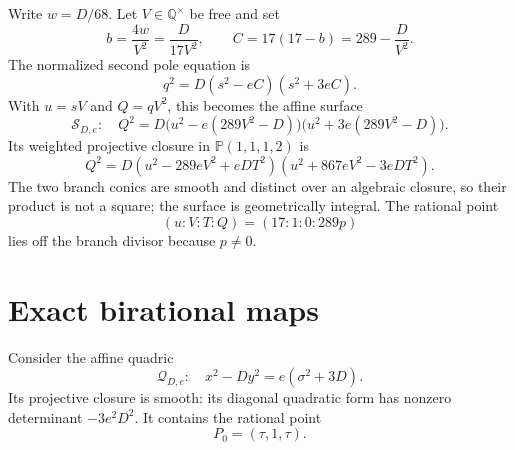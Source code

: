 \documentclass[11pt,a4paper]{article}
\theoremstyle{remark}\newtheorem{remark}[theorem]{Remark}
\newcommand{\Q}{\mathbb Q}\newcommand{\PP}{\mathbb P}
\begin{document}
Write $w=D/68$. Let $V\in\Q^\times$ be free and set
\begin{equation}\label{eq:input}
                 b=\frac{4w}{V^2}=\frac D{17V^2},
                 \qquad C=17(17-b)=289-\frac D{V^2}.
\end{equation}
The normalized second pole equation is
\begin{equation}\label{eq:normalized}
                         q^2=D(s^2-eC)(s^2+3eC).
\end{equation}
With $u=sV$ and $Q=qV^2$, this becomes the affine surface
\begin{equation}\label{eq:surface}
 \mathcal S_{D,e}:\quad
 Q^2=D\bigl(u^2-e(289V^2-D)\bigr)
          \bigl(u^2+3e(289V^2-D)\bigr).
\end{equation}
Its weighted projective closure in $\PP(1,1,1,2)$ is
\begin{equation}\label{eq:projective}
 Q^2=D(u^2-289eV^2+eDT^2)(u^2+867eV^2-3eDT^2).
\end{equation}
The two branch conics are smooth and distinct over an algebraic closure,
so their product is not a square; the surface is geometrically integral.
The rational point
\[
                     (u:V:T:Q)=(17:1:0:289p)
\]
lies off the branch divisor because $p\ne0$.

\section{Exact birational maps}
Consider the affine quadric
\begin{equation}\label{eq:quadric}
 \mathcal Q_{D,e}:\quad x^2-Dy^2=e(\sigma^2+3D).
\end{equation}
Its projective closure is smooth: its diagonal quadratic form has
nonzero determinant $-3e^2D^2$. It contains the rational point
\begin{equation}\label{eq:point}
                         P_0=(\tau,1,\tau).
\end{equation}
\end{document}
